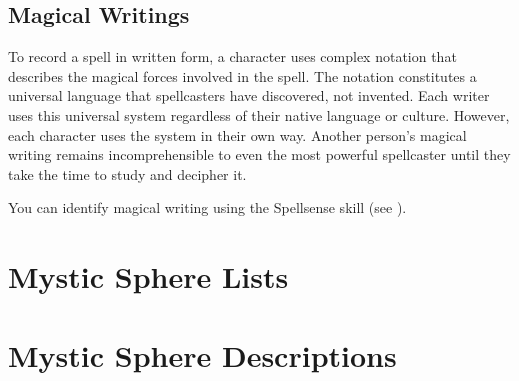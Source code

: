     \subsection{Magical Writings}
        To record a spell in written form, a character uses complex notation that describes the magical forces involved in the spell.
        The notation constitutes a universal language that spellcasters have discovered, not invented.
        Each writer uses this universal system regardless of their native language or culture.
        However, each character uses the system in their own way.
        Another person's magical writing remains incomprehensible to even the most powerful spellcaster until they take the time to study and decipher it.

        You can identify magical writing using the Spellsense skill (see ).


\section{Mystic Sphere Lists}\label{Mystic Sphere Lists}

    

\section{Mystic Sphere Descriptions}\label{Mystic Sphere Descriptions}

    

